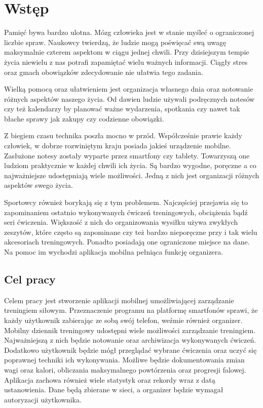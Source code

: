 \chapter[Wstęp.]{Wstęp}

Pamięć bywa bardzo ulotna. Mózg człowieka jest w stanie myśleć o ograniczonej liczbie spraw. Naukowcy twierdzą, że ludzie mogą poświęcać swą uwagę maksymalnie czterem aspektom w ciągu jednej chwili. Przy dzisiejszym tempie życia niewielu z nas potrafi zapamiętać wielu ważnych informacji. Ciągły stres oraz gmach obowiązków zdecydowanie nie ułatwia tego zadania.

Wielką pomocą oraz ułatwieniem jest organizacja własnego dnia oraz notowanie różnych aspektów naszego życia. Od dawien ludzie używali podręcznych notesów czy też kalendarzy by planować ważne wydarzenia, spotkania czy nawet tak błache sprawy jak zakupy czy codzienne obowiązki.

Z biegiem czasu technika poszła mocno w przód. Współcześnie prawie każdy człowiek, w dobrze rozwiniętym kraju posiada jakieś urządzenie mobilne. Zasłużone notesy zostały wyparte przez smartfony czy tablety. Towarzyszą one ludziom praktycznie w każdej chwili ich życia. Są bardzo wygodne, poręczne a co najważniejsze udostępniają wiele możliwości. Jedną z nich jest organizacji różnych aspektów swego życia.

Sportowcy również borykają się z tym problemem. Najczęściej przejawia się to zapominaniem ostatnio wykonywanych ćwiczeń treningowych, obciążenia bądź seri ćwiczenia. Większość z nich do organizowania wysiłku używa zwykłych zeszytów, które często są zapominane czy też bardzo nieporęczne przy i tak wielu akcesoriach treningowych. Ponadto posiadają one ograniczone miejsce na dane. Na pomoc im wychodzi aplikacja mobilna pełniąca funkcję organizera. 

\section{Cel pracy}

Celem pracy jest stworzenie aplikacji mobilnej umożliwiającej zarządzanie treningiem siłowym.
Przeznaczenie programu na platformę smartfonów sprawi, że każdy użytkownik zabierając ze sobą swój telefon, weźmie również organizer. Mobilny dziennik treningowy udostępni wiele możliwości zarządzanie treningiem. Najważniejszą z nich będzie notowanie oraz archiwizacja wykonywanych ćwiczeń. Dodatkowo użytkownik będzie mógł przeglądać wybrane ćwiczenia oraz uczyć się poprawnej techniki ich wykonywania. Możliwe będzie dokumentowania zmian wagi oraz kalori, obliczania maksymalnego powtórzenia oraz progresji falowej. Aplikacja zachowa również wiele statystyk oraz rekordy wraz z datą ustanowienia. Dane będą zbierane w sieci, a organizer będzie wymagał autoryzacji użytkownika.


